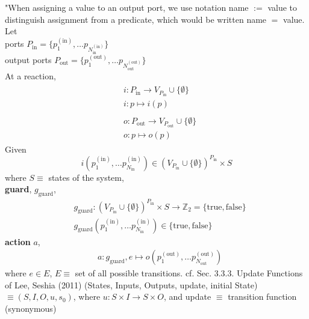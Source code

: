 \documentclass[10pt]{amsart}
\begin{document}
\begin{multicols*}{2}
"When assigning a value to an output port, we use notation name $:=$ value to distinguish assignment from a predicate, which would be written name $=$ value.  
Let \\
ports $P_{\text{in}} = \lbrace p_1^{(\text{in})}, \dots p_{N_{\text{in}}^{(\text{in})}} \rbrace$ \\
output ports $P_{\text{out}} = \lbrace p_1^{(\text{out})}, \dots p_{N_{\text{out}}^{(\text{out})}} \rbrace$ \\
At a reaction, 
\begin{equation}
\begin{gathered}
\begin{aligned}
& i: P_{\text{in}} \to V_{P_{\text{in}}} \cup \lbrace \emptyset \rbrace \\
& i: p \mapsto i(p) 
\end{aligned} \\
\begin{aligned}
& o: P_{\text{out}} \to V_{P_{\text{out}}} \cup \lbrace \emptyset \rbrace \\ 
& o: p \mapsto o(p)	
\end{aligned}
\end{gathered}
\end{equation}
Given 
\[
i(p_1^{(\text{in})}, \dots p_{N_{\text{in}}}^{(\text{in}) } )  \in ( V_{P_{\text{in}}} \cup \lbrace \emptyset \rbrace )^{P_{\text{in}} } \times S
\]
where $S \equiv $ states of the system,  \\
\textbf{guard}, $g_{\text{guard}}$, 
\begin{equation}
\begin{aligned}
& g_{\text{guard}} : ( V_{P_{\text{in}}} \cup \lbrace \emptyset \rbrace )^{P_{\text{in}} } \times S \to \mathbb{Z}_2 = \lbrace \text{true}, \text{false} \rbrace \\ 
& g_{\text{guard}}( p_1^{(\text{in})}, \dots p_{N_{\text{in}}}^{(\text{in})} ) \in \lbrace \text{true}, \text{false} \rbrace 
\end{aligned}
\end{equation}
\textbf{action}  $a$, 
\begin{equation}
\begin{aligned}
& a : g_{\text{guard}}, e \mapsto o( p_1^{(\text{out})}, \dots p_{N_{\text{out}}}^{(\text{out})} )
\end{aligned}
\end{equation}
where  $e\in E$, $E \equiv $ set of all possible transitions.  
cf. Sec. 3.3.3. Update Functions of Lee, Seshia (2011)  
(States, Inputs, Outputs, update, initial State) $\equiv  (S,I, O, u,s_0)$,  
where $u: S\times I \to S \times O$, and update $\equiv $ transition function (synonymous)







\end{multicols*}
\end{document}
